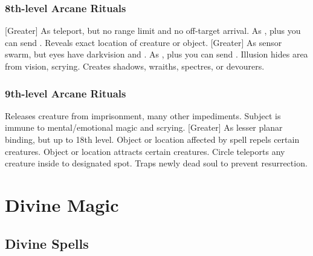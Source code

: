 \subsubsection{8th-level Arcane Rituals}
\begin{rituallist}
    [Greater] As teleport, but no range limit and no off-target arrival.
     As , plus you can send .
     Reveals exact location of creature or object.
    [Greater] As sensor swarm, but eyes have darkvision and .
     As , plus you can send .
     Illusion hides area from vision, scrying.
    \M Creates shadows, wraiths, spectres, or devourers.
\end{rituallist}

\subsubsection{9th-level Arcane Rituals}
\begin{rituallist}
     Releases creature from imprisonment, many other impediments.
     Subject is immune to mental/emotional magic and scrying.
    [Greater] As lesser planar binding, but up to 18th level.
     Object or location affected by spell repels certain creatures.
    \F Object or location attracts certain creatures.
     Circle teleports any creature inside to designated spot.
    \F Traps newly dead soul to prevent resurrection.
\end{rituallist}

\section{Divine Magic}\label{Divine Magic}

\subsection{Divine Spells}\label{Divine Spells}

